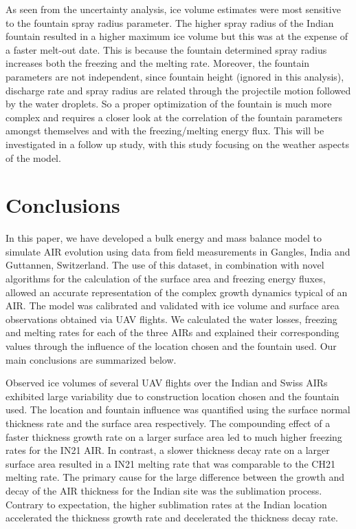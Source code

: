 \documentclass[utf8]{frontiersSCNS} %
\begin{document}
As seen from the uncertainty analysis, ice volume estimates were most sensitive to the fountain spray radius
parameter. The higher spray radius of the Indian fountain resulted in a higher maximum ice volume but this was
at the expense of a faster melt-out date. This is because the fountain determined spray radius increases both
the freezing and the melting rate. Moreover, the fountain parameters are not independent, since fountain height
(ignored in this analysis), discharge rate and spray radius are related through the projectile motion followed
by the water droplets. So a proper optimization of the fountain is much more complex and requires a closer look
at the correlation of the fountain parameters amongst themselves and with the freezing/melting energy flux. This
will be investigated in a follow up study, with this study focusing on the weather aspects of the model.

\section{Conclusions}

In this paper, we have developed a bulk energy and mass balance model to simulate AIR evolution using data from
field measurements in Gangles, India and Guttannen, Switzerland. The use of this dataset, in combination with
novel algorithms for the calculation of the surface area and freezing energy fluxes, allowed an accurate
representation of the complex growth dynamics typical of an AIR. The model was calibrated and validated with ice
volume and surface area observations obtained via UAV flights. We calculated the water losses, freezing and
melting rates for each of the three AIRs and explained their corresponding values through the influence of the
location chosen and the fountain used. Our main conclusions are summarized below.

Observed ice volumes of several UAV flights over the Indian and Swiss AIRs exhibited large variability due to
construction location chosen and the fountain used. The location and fountain influence was quantified using the
surface normal thickness rate and the surface area respectively. The compounding effect of a faster thickness
growth rate on a larger surface area led to much higher freezing rates for the IN21 AIR. In contrast, a slower
thickness decay rate on a larger surface area resulted in a IN21 melting rate that was comparable to the CH21 melting
rate. The primary cause for the large difference between the growth and decay of the AIR thickness for the
Indian site was the sublimation process.  Contrary to expectation, the higher sublimation rates at the Indian
location accelerated the thickness growth rate and decelerated the thickness decay rate.
\end{document}
